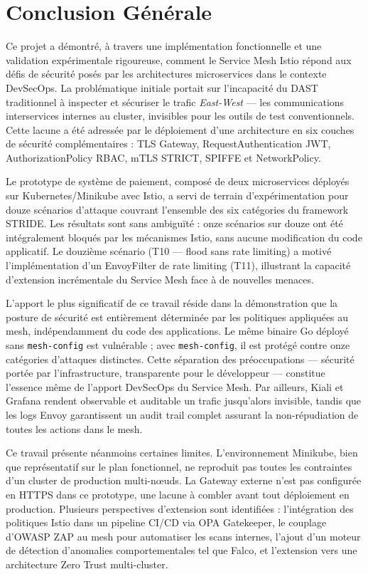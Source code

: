 \chapter*{Conclusion Générale}

Ce projet a démontré, à travers une implémentation fonctionnelle et une validation
expérimentale rigoureuse, comment le Service Mesh Istio répond aux défis de sécurité
posés par les architectures microservices dans le contexte DevSecOps. La problématique
initiale portait sur l'incapacité du DAST traditionnel à inspecter et sécuriser le
trafic \textit{East-West} --- les communications interservices internes au cluster,
invisibles pour les outils de test conventionnels. Cette lacune a été adressée par
le déploiement d'une architecture en six couches de sécurité complémentaires : TLS
Gateway, RequestAuthentication JWT, AuthorizationPolicy RBAC, mTLS STRICT, SPIFFE
et NetworkPolicy.

Le prototype de système de paiement, composé de deux microservices déployés sur
Kubernetes/Minikube avec Istio, a servi de terrain d'expérimentation pour douze
scénarios d'attaque couvrant l'ensemble des six catégories du framework STRIDE.
Les résultats sont sans ambiguïté : onze scénarios sur douze ont été intégralement
bloqués par les mécanismes Istio, sans aucune modification du code applicatif.
Le douzième scénario (T10 --- flood sans rate limiting) a motivé l'implémentation
d'un EnvoyFilter de rate limiting (T11), illustrant la capacité d'extension
incrémentale du Service Mesh face à de nouvelles menaces.

L'apport le plus significatif de ce travail réside dans la démonstration que la
posture de sécurité est entièrement déterminée par les politiques appliquées au
mesh, indépendamment du code des applications. Le même binaire Go déployé sans
\texttt{mesh-config} est vulnérable ; avec \texttt{mesh-config}, il est protégé
contre onze catégories d'attaques distinctes. Cette séparation des préoccupations
--- sécurité portée par l'infrastructure, transparente pour le développeur ---
constitue l'essence même de l'apport DevSecOps du Service Mesh. Par ailleurs,
Kiali et Grafana rendent observable et auditable un trafic jusqu'alors invisible,
tandis que les logs Envoy garantissent un audit trail complet assurant la
non-répudiation de toutes les actions dans le mesh.

Ce travail présente néanmoins certaines limites. L'environnement Minikube, bien
que représentatif sur le plan fonctionnel, ne reproduit pas toutes les contraintes
d'un cluster de production multi-nœuds. La Gateway externe n'est pas configurée
en HTTPS dans ce prototype, une lacune à combler avant tout déploiement en
production. Plusieurs perspectives d'extension sont identifiées : l'intégration
des politiques Istio dans un pipeline CI/CD via OPA Gatekeeper, le couplage
d'OWASP ZAP au mesh pour automatiser les scans internes, l'ajout d'un moteur
de détection d'anomalies comportementales tel que Falco, et l'extension vers une
architecture Zero Trust multi-cluster.

